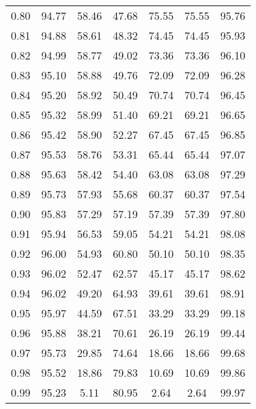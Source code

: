 \begin{tabular}{|c|c|c|c|c|c|c|}
      0.80 &     94.77 &     58.46 &      47.68 &   75.55 &      75.55 &         95.76 \\
      0.81 &     94.88 &     58.61 &      48.32 &   74.45 &      74.45 &         95.93 \\
      0.82 &     94.99 &     58.77 &      49.02 &   73.36 &      73.36 &         96.10 \\
      0.83 &     95.10 &     58.88 &      49.76 &   72.09 &      72.09 &         96.28 \\
      0.84 &     95.20 &     58.92 &      50.49 &   70.74 &      70.74 &         96.45 \\
      0.85 &     95.32 &     58.99 &      51.40 &   69.21 &      69.21 &         96.65 \\
      0.86 &     95.42 &     58.90 &      52.27 &   67.45 &      67.45 &         96.85 \\
      0.87 &     95.53 &     58.76 &      53.31 &   65.44 &      65.44 &         97.07 \\
      0.88 &     95.63 &     58.42 &      54.40 &   63.08 &      63.08 &         97.29 \\
      0.89 &     95.73 &     57.93 &      55.68 &   60.37 &      60.37 &         97.54 \\
      0.90 &     95.83 &     57.29 &      57.19 &   57.39 &      57.39 &         97.80 \\
      0.91 &     95.94 &     56.53 &      59.05 &   54.21 &      54.21 &         98.08 \\
      0.92 &     96.00 &     54.93 &      60.80 &   50.10 &      50.10 &         98.35 \\
      0.93 &     96.02 &     52.47 &      62.57 &   45.17 &      45.17 &         98.62 \\
      0.94 &     96.02 &     49.20 &      64.93 &   39.61 &      39.61 &         98.91 \\
      0.95 &     95.97 &     44.59 &      67.51 &   33.29 &      33.29 &         99.18 \\
      0.96 &     95.88 &     38.21 &      70.61 &   26.19 &      26.19 &         99.44 \\
      0.97 &     95.73 &     29.85 &      74.64 &   18.66 &      18.66 &         99.68 \\
      0.98 &     95.52 &     18.86 &      79.83 &   10.69 &      10.69 &         99.86 \\
      0.99 &     95.23 &      5.11 &      80.95 &    2.64 &       2.64 &         99.97 \\
\bottomrule
\end{tabular}
